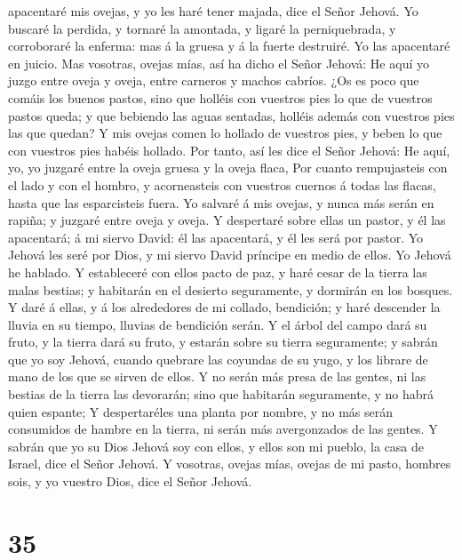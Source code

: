 apacentaré mis ovejas, y yo les haré tener majada, dice el Señor Jehová.
 Yo buscaré la perdida, y tornaré la amontada, y ligaré
la perniquebrada, y corroboraré la enferma: mas á la gruesa y á la
fuerte destruiré. Yo las apacentaré en juicio.  Mas
vosotras, ovejas mías, así ha dicho el Señor Jehová: He aquí yo juzgo
entre oveja y oveja, entre carneros y machos cabríos. 
¿Os es poco que comáis los buenos pastos, sino que holléis con vuestros
pies lo que de vuestros pastos queda; y que bebiendo las aguas sentadas,
holléis además con vuestros pies las que quedan?  Y mis
ovejas comen lo hollado de vuestros pies, y beben lo que con vuestros
pies habéis hollado.  Por tanto, así les dice el Señor
Jehová: He aquí, yo, yo juzgaré entre la oveja gruesa y la oveja flaca,
 Por cuanto rempujasteis con el lado y con el hombro, y
acorneasteis con vuestros cuernos á todas las flacas, hasta que las
esparcisteis fuera.  Yo salvaré á mis ovejas, y nunca más
serán en rapiña; y juzgaré entre oveja y oveja.  Y
despertaré sobre ellas un pastor, y él las apacentará; á mi siervo
David: él las apacentará, y él les será por pastor.  Yo
Jehová les seré por Dios, y mi siervo David príncipe en medio de ellos.
Yo Jehová he hablado.  Y estableceré con ellos pacto de
paz, y haré cesar de la tierra las malas bestias; y habitarán en el
desierto seguramente, y dormirán en los bosques.  Y daré
á ellas, y á los alrededores de mi collado, bendición; y haré descender
la lluvia en su tiempo, lluvias de bendición serán.  Y el
árbol del campo dará su fruto, y la tierra dará su fruto, y estarán
sobre su tierra seguramente; y sabrán que yo soy Jehová, cuando quebrare
las coyundas de su yugo, y los librare de mano de los que se sirven de
ellos.  Y no serán más presa de las gentes, ni las
bestias de la tierra las devorarán; sino que habitarán seguramente, y no
habrá quien espante;  Y despertaréles una planta por
nombre, y no más serán consumidos de hambre en la tierra, ni serán más
avergonzados de las gentes.  Y sabrán que yo su Dios
Jehová soy con ellos, y ellos son mi pueblo, la casa de Israel, dice el
Señor Jehová.  Y vosotras, ovejas mías, ovejas de mi
pasto, hombres sois, y yo vuestro Dios, dice el Señor Jehová.

\hypertarget{section-34}{%
\section{35}\label{section-34}}

